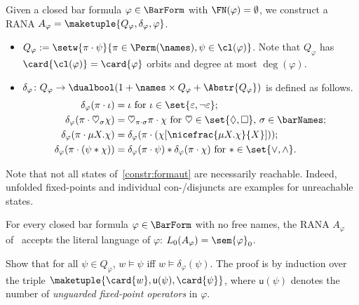 \documentclass[10pt, final, conference, a4paper, twocolumn]{IEEEtran}
\begin{document}
\begin{construction}\label{constr:formaut}
  Given a closed bar formula $\varphi \in \BarForm$ with $\FN(\varphi) = \emptyset$, we
  construct a RANA $A_\varphi = \maketuple{Q_\varphi,\delta_\varphi,\varphi}$.
  \begin{itemize}
    \item $Q_\varphi := \setw{\pi \cdot \psi}{\pi \in \Perm(\names), \psi \in \cl(\varphi)}$. Note that
      $Q_\varphi$ has $\card{\cl(\varphi)} = \card{\varphi}$ orbits and  degree at most
      $\deg(\varphi)$.
    \item $\delta_\varphi\colon Q_\varphi \to \dualbool(1 + \names \times Q_\varphi + \Abstr{Q_\varphi})$
      is defined as follows.
      \begin{align*}
        \delta_\varphi(\pi \cdot \iota)
        &= \iota\ \text{for $\iota \in \set{\varepsilon, \neg\varepsilon}$}; \\
        \delta_\varphi(\pi \cdot \heartsuit_\sigma \chi)
        &= \heartsuit_{\pi\cdot\sigma} \pi \cdot \chi\
        \text{for $\heartsuit \in \set{\Diamond, \Box}$, $\sigma \in \barNames$}; \\
        \delta_\varphi(\pi \cdot \mu X.\chi)
        &= \delta_\varphi(\pi \cdot (\chi[\nicefrac{\mu X.\chi}{X}])); \\
        \delta_\varphi(\pi \cdot (\psi \ast \chi))
        &= \delta_\varphi(\pi \cdot \psi) \ast \delta_\varphi(\pi \cdot \chi)\ \text{for $\ast \in \set{\vee, \wedge}$}.
    \end{align*}
  \end{itemize}
\end{construction}

\begin{rem}\label{rem:formautconstr}
  Note that not all states of~\cref{constr:formaut} are necessarily reachable. Indeed, unfolded fixed-points and
  individual con-/disjuncts are examples for unreachable states.
\end{rem}

\begin{theo}\label{theo:corrFormAut}
  For every closed bar formula $\varphi \in \BarForm$ with no free names, the RANA $A_\varphi$ of~
  accepts the literal language of $\varphi$: $L_0(A_\varphi) = \sem{\varphi}_0$.
\end{theo}
\begin{IEEEproof}
  Show that for all $\psi \in Q_\varphi$,
  $w \vDash \psi$ iff $w \vDash \delta_\varphi(\psi)$. The proof
  is by induction over the triple $\maketuple{\card{w}, \textsf{u}(\psi),
  \card{\psi}}$, where $\textsf{u}(\psi)$ denotes the number of \emph{unguarded fixed-point operators} in
  $\varphi$.
\end{IEEEproof}
\end{document}
